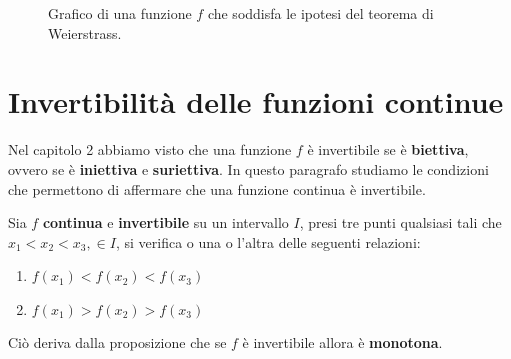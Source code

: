 \documentclass{book}
\begin{document}
\begin{figure}[H]
    \caption{Grafico di una funzione \(f\) che soddisfa le ipotesi del teorema di Weierstrass.}
\end{figure}

\section{Invertibilità delle funzioni continue}
Nel capitolo 2 abbiamo visto che una funzione \(f\) è invertibile se è \textbf{biettiva}, ovvero se è \textbf{iniettiva} e \textbf{suriettiva}. In questo paragrafo studiamo le condizioni che permettono di affermare che una funzione continua è invertibile.
\begin{proposition}
    Sia \(f\) \textbf{continua} e \textbf{invertibile} su un intervallo \(I\), presi tre punti qualsiasi tali che \(x_1 < x_2 < x_3, \in I\), si verifica o una o l'altra delle seguenti relazioni:
    \begin{enumerate}
        \item \(f(x_1) < f(x_2) < f(x_3)\)
        \item \(f(x_1) > f(x_2) > f(x_3)\)
    \end{enumerate}
    Ciò deriva dalla proposizione che se \(f\) è invertibile allora è \textbf{monotona}.
\end{proposition}
\end{document}
